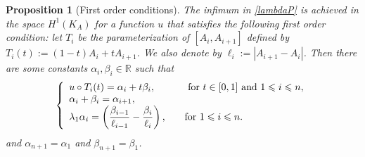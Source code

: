 \documentclass[12pt,english]{smfart} %
\newtheorem{proposition}[theorem]{Proposition}
\theoremstyle{remark}
\newcommand{\R}{\mathbb{R}}
\begin{document}
 \medskip\begin{proposition}[First order conditions] \label{firstorder1}  The infimum in \eqref{lambdaP} is achieved  in the space $H^1(K_A)$ for a function $u$ that satisfies the following first order condition: let  $T_i$ be the parameterization of $[A_i,A_{i+1}]$ defined by $T_i(t) := (1-t)A_i + tA_{i+1}$. We also denote by $\ell_i:=|A_{i+1}-A_i|$. Then there are  some constants $\alpha_i,\beta_i \in \R$ such that
$$
\left\{
 \begin{array}{ll}
u\circ T_i(t)=\alpha_i +t \beta_i, \quad  &\textnormal{ for } t\in[0,1] \textnormal{ and }  1\leqslant i \leqslant n,\\
\alpha_i+\beta_i=\alpha_{i+1},\\\displaystyle 
\lambda_1\alpha_i=\left(\frac{\beta_{i-1}}{\ell_{i-1}} - \frac{\beta_i}{\ell_i}\right), \quad &\textnormal{for } 1\leqslant i  \leqslant n.
 \end{array}
  \right. 
 $$
and $\alpha_{n+1}=\alpha_1$ and $\beta_{n+1}=\beta_1$.
 \end{proposition}
 
\end{document}
